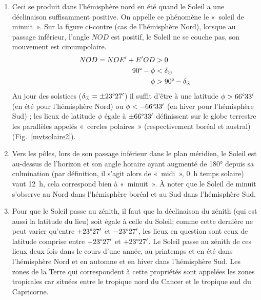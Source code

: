 \documentclass[a4paper,10pt]{report}
\renewcommand{\deg}{\ensuremath{\degree}}
\begin{document}
\begin{Answer}
\begin{enumerate}
  \item Ceci se produit dans l'hémisphère nord en été quand le Soleil
    a une déclinaison suffisamment positive. On appelle ce phénomène
    le «~soleil de minuit~». Sur la figure ci-contre (cas de
    l'hémisphère Nord), lorsque au passage inférieur, l'angle $NOD$
    est positif, le Soleil ne se couche pas, son mouvement est
    circumpolaire.
    \begin{align*}
      NOD = NOE' + E'OD &> 0 \\
      90\deg - \phi &< \delta_{\odot} \\
      \phi &> 90\deg - \delta_{\odot}
    \end{align*}
    Au jour des solstices ($\delta_{\odot} = \pm 23\deg27'$) il
    suffit d'être à une latitude $\phi > 66\deg33'$ (en été pour
    l'hémisphère Nord) ou $\phi < - 66\deg33'$ (en hiver pour
    l'hémisphère Sud) ; les lieux de latitude $\phi$ égale à $\pm
    66\deg33'$ définissent sur le globe terrestre les parallèles
    appelés «~cercles polaires~» (respectivement boréal et austral)
    (Fig.~\ref{mvtsolaire2}).

  \item Vers les pôles, lors de son passage inférieur dans le plan
    méridien, le Soleil est au-dessus de l'horizon et son angle
    horaire ayant augmenté de 180° depuis sa culmination (par
    définition, il s'agit alors de «~midi~», 0~h temps solaire) vaut
    12~h, cela correspond bien à «~minuit~». À noter que le Soleil de
    minuit s'observe au Nord dans l'hémisphère boréal et au Sud dans
    l'hémisphère Sud.

  \item Pour que le Soleil passe au zénith, il faut que la déclinaison
    du zénith (qui est aussi la latitude du lieu) soit égale à celle
    du Soleil; comme cette dernière ne peut varier qu'entre
    $+23\deg27'$ et $-23\deg27'$, les lieux en question sont ceux
    de latitude comprise entre $-23\deg27'$ et $+23\deg27'$. Le
    Soleil passe au zénith de ces lieux deux fois dans le cours d'une
    année, au printemps et en été dans l'hémisphère Nord et en automne
    et en hiver dans l'hémisphère Sud. Les zones de la Terre qui
    correspondent à cette propriétés sont appelées les zones
    tropicales car situées entre le tropique nord du Cancer et le
    tropique sud du Capricorne.


\end{enumerate}
\end{Answer}
\end{document}
